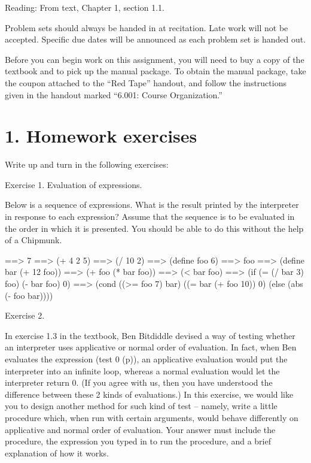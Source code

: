 \vpar
Reading: From text, Chapter 1, section 1.1.

Problem sets should always be handed in at recitation.  Late work will
not be accepted.
Specific due dates will be announced as each problem set is handed
out.

Before you can begin work on this assignment, you will need to buy
a copy of the textbook and to pick up
the manual package.  To obtain the manual package, take the coupon
attached to the ``Red Tape'' handout, and follow the instructions
given in the handout marked ``6.001: Course Organization.''

\chapter{1. Homework exercises}

Write up and turn in the following exercises:

\beginbullets

\bpar Exercise 1.  Evaluation of expressions.

\ftpar{\hskip \parindent}
Below is a sequence of expressions.  What is the result printed by the 
interpreter in response to each expression?  Assume that the sequence is to be
evaluated in the order in which it is presented.  You should be able to do this
without the help of a Chipmunk.

\beginlisp

==> 7
\pbrk
==> (+ 4 2 5)
\pbrk
==> (/ 10 2)
\pbrk
==> (define foo 6)
\pbrk
==> foo
\pbrk
==> (define bar (+ 12 foo))
\pbrk
==> (+ foo (* bar foo))
\pbrk
==> (< bar foo)
\pbrk
==> (if (= (/ bar 3) foo)
        (- bar foo)
        0)
\pbrk
==> (cond ((>= foo 7) bar)
          ((= bar (+ foo 10)) 0)
          (else (abs (- foo bar))))
\endlisp

\bpar Exercise 2.

\ftpar{\hskip \parindent}
In exercise 1.3 in the textbook, Ben Bitdiddle devised a way of
testing whether an interpreter uses applicative or normal order of evaluation.
In fact, when Ben evaluates the expression (test 0 (p)), an applicative 
evaluation would put the interpreter into an infinite loop, whereas a normal
evaluation would let the interpreter return 0.  (If you agree with us, then you
have understood the difference between these 2 kinds of evaluations.)  In this
exercise, we would like you to design another method for such kind of test -- 
namely, write a little procedure which, when run with certain arguments, would
behave differently on applicative and normal order of evaluation.  Your answer
must include the procedure, the expression you typed in to run the procedure,
and a brief explanation of how it works.

